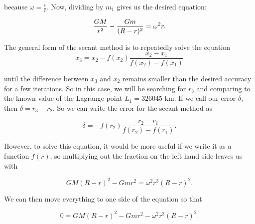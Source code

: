\documentclass[11pt]{article}
\begin{document}
because \(\omega = \frac vr.\) Now, dividing by \(m_1\) gives us the
desired equation:

\[{GM\over r^2} - {Gm\over(R-r)^2} = \omega^2 r.\]

The general form of the secant method is to repeatedly solve the
equation \[x_3 = x_2 - f(x_2)\frac{x_2 -x_1}{f(x_2)-f(x_1)}\]

until the difference between \(x_3\) and \(x_2\) remains smaller than
the desired accuracy for a few iterations. So in this case, we will be
searching for \(r_3\) and comparing to the known value of the Lagrange
point \(L_1 = 326045 \text{ km}\). If we call our error \(\delta,\) then
\(\delta = r_3 - r_2.\) So we can write the error for the secant method
as

\[\delta = -f(r_2)\frac{r_2 -r_1}{f(r_2)-f(r_1)}.\]

However, to solve this equation, it would be more useful if we write it
as a function \(f(r)\), so multiplying out the fraction on the left hand
side leaves us with

\[{GM(R-r)^2} - {Gmr^2} = \omega^2 r^3(R-r)^2.\]

We can then move everything to one side of the equation so that

\[0 = {GM(R-r)^2} - {Gmr^2} - \omega^2 r^3(R-r)^2.\]
\end{document}
